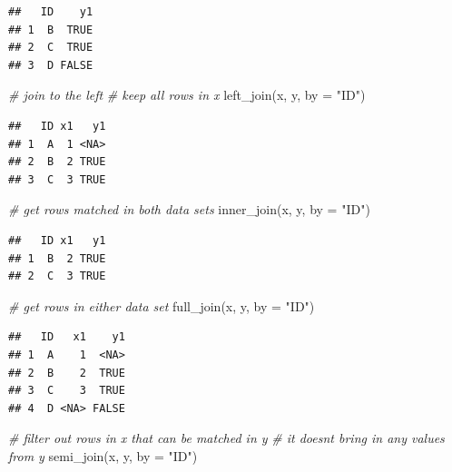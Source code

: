 \documentclass[
  12pt,
]{krantz}
\makeatletter
\newenvironment{Shaded}{\begin{snugshade}}{\end{snugshade}}
\newcommand{\AttributeTok}[1]{\textcolor[rgb]{0.61,0.61,0.61}{#1}}
\newcommand{\CommentTok}[1]{\textcolor[rgb]{0.37,0.37,0.37}{\textit{#1}}}
\newcommand{\FunctionTok}[1]{\textcolor[rgb]{0,0,0}{#1}}
\newcommand{\NormalTok}[1]{#1}
\newcommand{\StringTok}[1]{\textcolor[rgb]{0.5,0.5,0.5}{#1}}
\newenvironment{kframe}{%
\medskip{}
\setlength{\fboxsep}{.8em}
 \def\at@end@of@kframe{}%
 \ifinner\ifhmode%
  \def\at@end@of@kframe{\end{minipage}}%
  \begin{minipage}{\columnwidth}%
 \fi\fi%
 \def\FrameCommand##1{\hskip\@totalleftmargin \hskip-\fboxsep
 \colorbox{shadecolor}{##1}\hskip-\fboxsep
     \hskip-\linewidth \hskip-\@totalleftmargin \hskip\columnwidth}%
 \MakeFramed {\advance\hsize-\width
   \@totalleftmargin\z@ \linewidth\hsize
   \@setminipage}}%
 {\par\unskip\endMakeFramed%
 \at@end@of@kframe}
\renewenvironment{Shaded}{\begin{kframe}}{\end{kframe}}
\makeatother
\begin{document}
\begin{verbatim}
##   ID    y1
## 1  B  TRUE
## 2  C  TRUE
## 3  D FALSE
\end{verbatim}

\begin{Shaded}
\begin{Highlighting}[]
\CommentTok{\# join to the left}
\CommentTok{\# keep all rows in x}
\FunctionTok{left\_join}\NormalTok{(x, y, }\AttributeTok{by =} \StringTok{"ID"}\NormalTok{)}
\end{Highlighting}
\end{Shaded}

\begin{verbatim}
##   ID x1   y1
## 1  A  1 <NA>
## 2  B  2 TRUE
## 3  C  3 TRUE
\end{verbatim}

\begin{Shaded}
\begin{Highlighting}[]
\CommentTok{\# get rows matched in both data sets}
\FunctionTok{inner\_join}\NormalTok{(x, y, }\AttributeTok{by =} \StringTok{"ID"}\NormalTok{)}
\end{Highlighting}
\end{Shaded}

\begin{verbatim}
##   ID x1   y1
## 1  B  2 TRUE
## 2  C  3 TRUE
\end{verbatim}

\begin{Shaded}
\begin{Highlighting}[]
\CommentTok{\# get rows in either data set}
\FunctionTok{full\_join}\NormalTok{(x, y, }\AttributeTok{by =} \StringTok{"ID"}\NormalTok{)}
\end{Highlighting}
\end{Shaded}

\begin{verbatim}
##   ID   x1    y1
## 1  A    1  <NA>
## 2  B    2  TRUE
## 3  C    3  TRUE
## 4  D <NA> FALSE
\end{verbatim}

\begin{Shaded}
\begin{Highlighting}[]
\CommentTok{\# filter out rows in x that can be matched in y }
\CommentTok{\# it doesn\textquotesingle{}t bring in any values from y }
\FunctionTok{semi\_join}\NormalTok{(x, y, }\AttributeTok{by =} \StringTok{"ID"}\NormalTok{)}
\end{Highlighting}
\end{Shaded}
\end{document}
